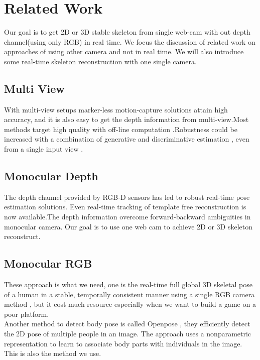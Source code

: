 \documentclass[11pt,twocolumn,letterpaper]{article}
\begin{document}
\section{Related Work}
Our goal is to get 2D or 3D stable skeleton from single web-cam with out depth channel(using only RGB) in real time. We focus the discussion of related work on approaches of using other camera and not in real time. We will also introduce some real-time skeleton reconstruction with one single camera.
  \subsection{Multi View}
  With multi-view setups marker-less motion-capture solutions attain high accuracy, and it is also easy to get the depth information from multi-view.Most methods target high quality with off-line computation \cite{Loper2014}\cite{twist}.Robustness could be increased with a combination of generative and discriminative estimation \cite{7299005}, even from a single input view \cite{Rosales2006}.
  \subsection{Monocular Depth}
  The depth channel provided by RGB-D sensors has led to robust real-time pose estimation solutions\cite{6126356}\cite{7457693}. Even real-time tracking of template free reconstruction is now available\cite{Dou:2016:FRP:2897824.2925969}.The depth information overcome forward-backward  ambiguities in monocular camera. Our goal is to use one web cam to achieve 2D or 3D skeleton reconstruct.
  \subsection{Monocular RGB}
  These approach is what we need, one is the real-time  full global 3D skeletal pose of a human in a stable, temporally consistent manner using a single RGB camera method \cite{VNect_SIGGRAPH2017}, but it cost much resource especially when we want to build a game on a poor platform.\\
  Another method to detect body pose is called Openpose \cite{cao2017realtime}\cite{wei2016cpm}, they efficiently detect the 2D pose of multiple people in an image. The approach uses a nonparametric representation to learn to associate body parts with individuals in the image. This is also the method we use.
\end{document}
